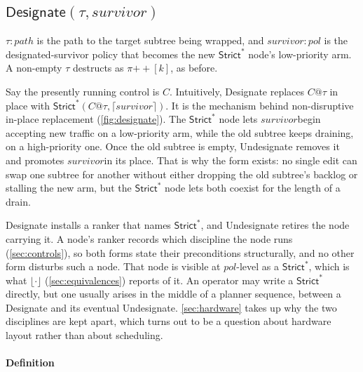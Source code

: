 \documentclass[sigplan,anonymous,review,nonacm]{acmart}
\newcommand{\notation}[1]{\ensuremath{#1}\ifmmode\else\xspace\fi}
\newcommand{\pol}{\notation{\mathit{pol}}}
\newcommand{\survivor}{\notation{\mathit{survivor}}}
\newcommand{\Strictstar}{\textsf{Strict}^{*}}
\newcommand{\Designate}{\textsf{Designate}}
\newcommand{\Undesignate}{\textsf{Undesignate}}
\begin{document}
\subsection{\texorpdfstring{\(\Designate(\tau, \mathit{survivor})\)}{Designate}}\label{sec:designate}


\(\tau : \mathit{path}\) is the path to the target subtree being wrapped, and \(\mathit{survivor} : \mathit{pol}\) is the designated-survivor policy that becomes the new \(\Strictstar\) node's low-priority arm.
A non-empty \(\tau\) destructs as \(\pi \mathbin{+\!\!+} [k]\), as before.

Say the presently running control is \(C\).
Intuitively, \Designate{} replaces \(C@\tau\) in place with \(\Strictstar(C@\tau, \lceil \mathit{survivor} \rceil)\).
It is the mechanism behind non-disruptive in-place replacement (\cref{fig:designate}).
The \(\Strictstar\) node lets \survivor begin accepting new traffic on a low-priority arm, while the old subtree keeps draining, on a high-priority one.
Once the old subtree is empty, \Undesignate{} removes it and promotes \survivor in its place.
That is why the form exists: no single edit can swap one subtree for another without either dropping the old subtree's backlog or stalling the new arm, but the \(\Strictstar\) node lets both coexist for the length of a drain.

\Designate{} installs a ranker that names \(\Strictstar\), and \Undesignate{} retires the node carrying it.
A node's ranker records which discipline the node runs (\cref{sec:controls}), so both forms state their preconditions structurally, and no other form disturbs such a node.
That node is visible at \pol-level as a \(\Strictstar\), which is what \(\lfloor \cdot \rfloor\) (\cref{sec:equivalences}) reports of it.
An operator may write a \(\Strictstar\) directly, but one usually arises in the middle of a planner sequence, between a \Designate{} and its eventual \Undesignate.
\cref{sec:hardware} takes up why the two disciplines are kept apart, which turns out to be a question about hardware layout rather than about scheduling.


\paragraph{Definition}
\end{document}
